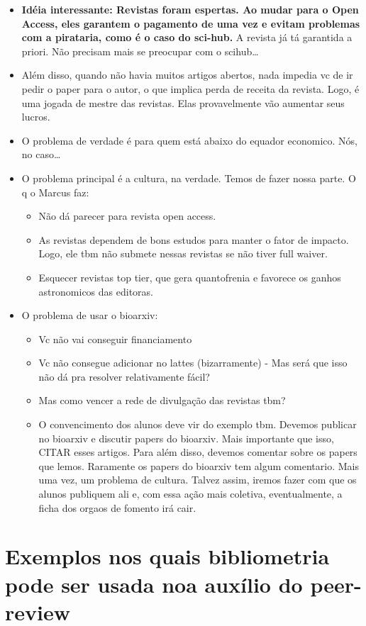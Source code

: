 \documentclass[11pt]{article}
\begin{document}
\begin{itemize}
\begin{itemize}
\item \textbf{Idéia interessante: Revistas foram espertas. Ao mudar para o Open Access, eles garantem o pagamento de uma vez e evitam problemas com a pirataria, como é o caso do sci-hub.} A revista já tá garantida a priori. Não precisam mais se preocupar com o scihub\ldots{}
\item Além disso, quando não havia muitos artigos abertos, nada impedia vc de ir pedir o paper para o autor, o que implica perda de receita da revista. Logo, é uma jogada de mestre das revistas. Elas provavelmente vão aumentar seus lucros.
\item O problema de verdade é para quem está abaixo do equador economico. Nós, no caso\ldots{}
\item O problema principal é a cultura, na verdade. Temos de fazer nossa parte. O q o Marcus faz:
\begin{itemize}
\item Não dá parecer para revista open access.
\item As revistas dependem de bons estudos para manter o fator de impacto. Logo, ele tbm não submete nessas revistas se não tiver full waiver.
\item Esquecer revistas top tier, que gera quantofrenia e favorece os ganhos astronomicos das editoras.
\end{itemize}
\item O problema de usar o bioarxiv:
\begin{itemize}
\item Vc não vai conseguir financiamento
\item Vc não consegue adicionar no lattes (bizarramente) - Mas será que isso não dá pra resolver relativamente fácil?
\item Mas como vencer a rede de divulgação das revistas tbm?
\item O convencimento dos alunos deve vir do exemplo tbm. Devemos publicar no bioarxiv e discutir papers do bioarxiv. Mais importante que isso, CITAR esses artigos. Para além disso, devemos comentar sobre os papers que lemos. Raramente os papers do bioarxiv tem algum comentario. Mais uma vez, um problema de cultura. Talvez assim, iremos fazer com que os alunos publiquem ali e, com essa ação mais coletiva, eventualmente, a ficha dos orgaos de fomento irá cair.
\end{itemize}
\end{itemize}
\end{itemize}


\section{Exemplos nos quais bibliometria pode ser usada noa auxílio do peer-review}
\label{sec:org3ac3b44}
\end{document}
